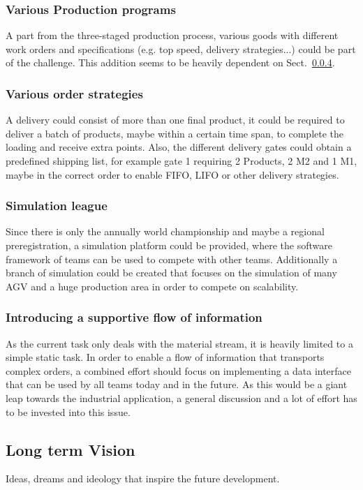 \documentclass[12pt,twoside]{article}
\begin{document}
\subsubsection{Various Production programs}
A part from the three-staged production process, various goods with
different work orders and specifications (e.g. top speed, delivery
strategies...) could be part of the challenge. This addition seems to
be heavily dependent on Sect.~\ref{sec:supp-flow}.

\subsubsection{Various order strategies}
A delivery could consist of more than one final product, it could be
required to deliver a batch of products, maybe within a certain time
span, to complete the loading and receive extra points. Also, the
different delivery gates could obtain a predefined shipping list, for
example gate 1 requiring 2 Products, 2 M2 and 1 M1, maybe in the
correct order to enable FIFO, LIFO or other delivery strategies.

\subsubsection{Simulation league}

Since there is only the annually world championship and maybe a
regional preregistration, a simulation platform could be provided,
where the software framework of teams can be used to compete with
other teams. Additionally a branch of simulation could be created that
focuses on the simulation of many AGV and a huge production area in
order to compete on scalability.

\subsubsection{Introducing a supportive flow of information}
\label{sec:supp-flow}

As the current task only deals with the material stream, it is heavily
limited to a simple static task. In order to enable a flow of
information that transports complex orders, a combined effort should
focus on implementing a data interface that can be used by all teams
today and in the future. As this would be a giant leap towards the
industrial application, a general discussion and a lot of effort has
to be invested into this issue.


\subsection{Long term Vision}
Ideas, dreams and ideology that inspire the future development.
\end{document}
